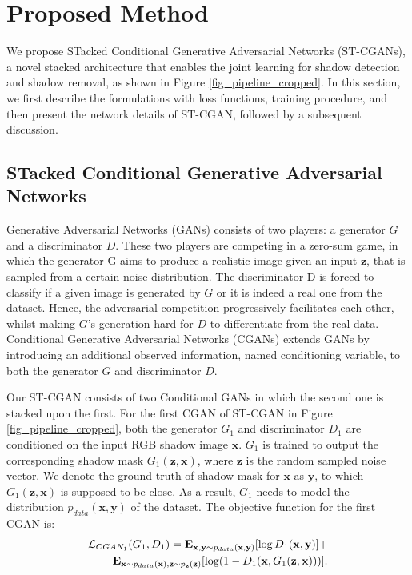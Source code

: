 \documentclass[10pt,twocolumn,letterpaper]{article}
\begin{document}
\section{Proposed Method}
We propose STacked Conditional Generative Adversarial Networks (ST-CGANs), a novel stacked architecture that enables the joint learning for shadow detection and shadow removal, as shown in Figure \ref{fig_pipeline_cropped}. In this section, we first describe the formulations with loss functions, training procedure, and then present the network details of ST-CGAN, followed by a subsequent discussion. 
\subsection{STacked Conditional Generative Adversarial Networks}
Generative Adversarial Networks (GANs) \cite{goodfellow2014generative} consists of two players: a generator $G$ and a discriminator $D$. These two players are competing in a zero-sum game, in which the generator G aims to produce a realistic image given an input $\mathbf{z}$, that is sampled from a certain noise distribution. The discriminator D is forced to classify if a given image is generated by $G$ or it is indeed a real one from the dataset. Hence, the adversarial competition progressively facilitates each other, whilst making $G$'s generation hard for $D$ to differentiate from the real data. Conditional Generative Adversarial Networks (CGANs) \cite{mirza2014conditional} extends GANs by introducing an additional observed information, named conditioning variable, to both the generator $G$ and discriminator $D$. 

Our ST-CGAN consists of two Conditional GANs in which the second one is stacked upon the first.
For the first CGAN of ST-CGAN in Figure \ref{fig_pipeline_cropped}, both the generator $G_1$ and discriminator $D_1$ are conditioned on the input RGB shadow image $\mathbf{x}$. $G_1$ is trained to output the corresponding shadow mask $G_1(\mathbf{z}, \mathbf{x})$, where $\mathbf{z}$ is the random sampled noise vector. We denote the ground truth of shadow mask for $\mathbf{x}$ as $\mathbf{y}$, to which $G_1(\mathbf{z}, \mathbf{x})$ is supposed to be close. As a result, $G_1$ needs to model the distribution $p_{data}(\mathbf{x}, \mathbf{y})$ of the dataset. The objective function for the first CGAN is:
\begin{eqnarray}
\small{ \mathcal{L}_{CGAN_1}(G_1,  D_1)= \mathbf{E}_{\mathbf{x}, \mathbf{y} \sim p_{data}(\mathbf{x}, \mathbf{y})}[\log {D_1(\mathbf{x}, \mathbf{y})}] + }\nonumber\\
\small{
	\mathbf{E}_{\mathbf{x} \sim p_{data}(\mathbf{x}), \mathbf{z} \sim p_{\mathbf{z}}(\mathbf{z})}[\log ({1 - D_1(\mathbf{x}, G_1(\mathbf{z}, \mathbf{x}))})].}
\label{eqa_CGAN1}
\end{eqnarray}
\end{document}
